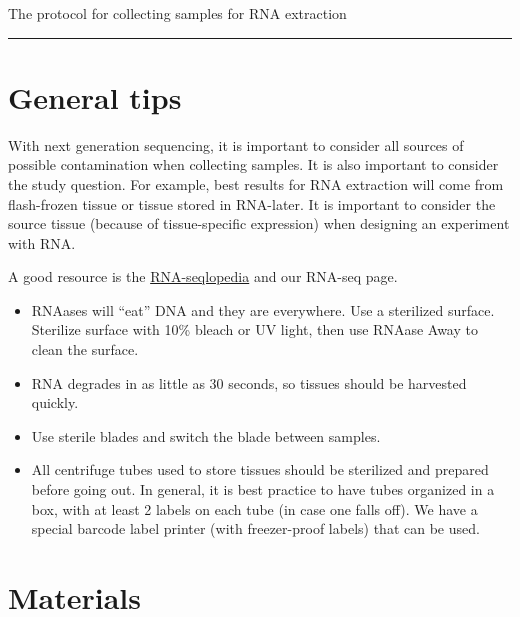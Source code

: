 \documentclass[
  letterpaper,
  DIV=11,
  numbers=noendperiod]{scrreprt}
\begin{document}
The protocol for collecting samples for RNA extraction

\begin{center}\rule{0.5\linewidth}{0.5pt}\end{center}

\hypertarget{general-tips}{%
\section*{\texorpdfstring{\textbf{General
tips}}{General tips}}\label{general-tips}}

With next generation sequencing, it is important to consider all sources
of possible contamination when collecting samples. It is also important
to consider the study question. For example, best results for RNA
extraction will come from flash-frozen tissue or tissue stored in
RNA-later. It is important to consider the source tissue (because of
tissue-specific expression) when designing an experiment with RNA.

A good resource is the \href{http://rnaseq.uoregon.edu/}{RNA-seqlopedia}
and our RNA-seq page.

\begin{itemize}
\item
  RNAases will ``eat'' DNA and they are everywhere. Use a sterilized
  surface. Sterilize surface with 10\% bleach or UV light, then use
  RNAase Away to clean the surface.
\item
  RNA degrades in as little as 30 seconds, so tissues should be
  harvested quickly.
\item
  Use sterile blades and switch the blade between samples.
\item
  All centrifuge tubes used to store tissues should be sterilized and
  prepared before going out. In general, it is best practice to have
  tubes organized in a box, with at least 2 labels on each tube (in case
  one falls off). We have a special barcode label printer (with
  freezer-proof labels) that can be used.
\end{itemize}

\hypertarget{materials-2}{%
\section*{Materials}\label{materials-2}}
\end{document}
